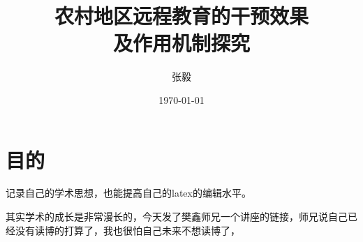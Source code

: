 \documentclass{article}
\title{农村地区远程教育的干预效果\\及作用机制探究}
\author{张毅}
\date{\today}
\begin{document}
\maketitle

\newpage
\section{目的}
记录自己的学术思想，也能提高自己的latex的编辑水平。
\par 其实学术的成长是非常漫长的，今天发了樊鑫师兄一个讲座的链接，师兄说自己已经没有读博的打算了，我也很怕自己未来不想读博了，


\par 
\end{document}
